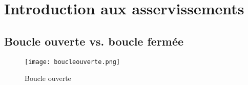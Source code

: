 \chapter{Introduction aux asservissements}

\section{Boucle ouverte vs. boucle fermée}
\label{sec:BoucleOuverteVsBoucleFermée}


\begin{figure}[htbp]
	\centering
		\texttt{[image: boucleouverte.png]}
	\caption{Boucle ouverte}
	\label{fig:boucleouverte}
\end{figure}
